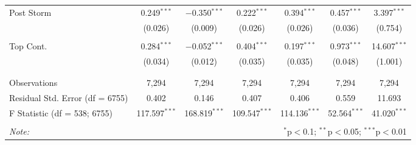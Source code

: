 \begin{table}[!htbp]
\begin{tabular}{@{\extracolsep{5pt}}lcccccc}
 Post Storm & 0.249$^{***}$ & $-$0.350$^{***}$ & 0.222$^{***}$ & 0.394$^{***}$ & 0.457$^{***}$ & 3.397$^{***}$ \\ 
  & (0.026) & (0.009) & (0.026) & (0.026) & (0.036) & (0.754) \\ 
  & & & & & & \\ 
 Top Cont. & 0.284$^{***}$ & $-$0.052$^{***}$ & 0.404$^{***}$ & 0.197$^{***}$ & 0.973$^{***}$ & 14.607$^{***}$ \\ 
  & (0.034) & (0.012) & (0.035) & (0.035) & (0.048) & (1.001) \\ 
  & & & & & & \\ 
\hline \\[-1.8ex] 
Observations & 7,294 & 7,294 & 7,294 & 7,294 & 7,294 & 7,294 \\ 
Residual Std. Error (df = 6755) & 0.402 & 0.146 & 0.407 & 0.406 & 0.559 & 11.693 \\ 
F Statistic (df = 538; 6755) & 117.597$^{***}$ & 168.819$^{***}$ & 109.547$^{***}$ & 114.136$^{***}$ & 52.564$^{***}$ & 41.020$^{***}$ \\ 
\hline 
\hline \\[-1.8ex] 
\textit{Note:}  & \multicolumn{6}{r}{$^{*}$p$<$0.1; $^{**}$p$<$0.05; $^{***}$p$<$0.01} \\ 
\end{tabular} 
\end{table} 
